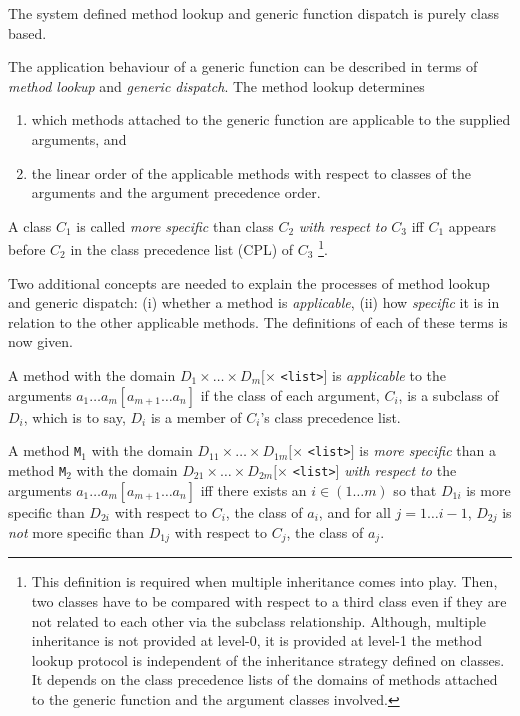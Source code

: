 \begin{optDefinition}
The system defined  method lookup and generic function dispatch is purely
class based.

The application behaviour of a generic function can be described in terms of
{\em method lookup\/} and {\em generic dispatch}. The method lookup determines
\begin{enumerate}
    \item which methods attached to the generic function are applicable to the
    supplied arguments, and

    \item the linear order of the applicable methods with respect to classes of
    the arguments and the argument precedence order.
\end{enumerate}

A class $C_1$ is called {\em more specific\/} than class $C_2$ {\em with respect
    to\/} $C_3$ iff $C_1$ appears before $C_2$ in the class precedence list
(CPL) of $C_3$
%
\footnote%
{%
    This definition is required when multiple
    inheritance comes into play. Then, two classes have to be compared with
    respect to a third class even if they are not related to each other via the
    subclass relationship.  Although, multiple inheritance is not provided at
    level-0, it is provided at level-1 the method lookup protocol is independent
    of the inheritance strategy defined on classes. It depends on the class
    precedence lists of the domains of methods attached to the generic function
    and the argument classes involved.%
}.

Two additional concepts are needed to explain the processes of method lookup and
generic dispatch: (i) whether a method is {\em applicable}, (ii) how {\em
    specific} it is in relation to the other applicable methods.  The
definitions of each of these terms is now given.

A method with the domain $D_1 \times \ldots \times D_m [\times$ \verb|<list>|$]$
is {\em applicable\/} to the arguments $a_1 \ldots a_m [a_{m+1} \ldots a_n]$ if
the class of each argument, $C_i$, is a subclass of $D_i$, which is to say,
$D_i$ is a member of $C_i$'s class precedence list.

A method {\tt M$_{1}$} with the domain $D_{11} \times \ldots \times D_{1m}
[\times$ \verb|<list>|$]$ is {\em more specific\/} than a method {\tt M$_{2}$}
with the domain $D_{21} \times \ldots \times D_{2m} [\times$ \verb|<list>|$]$
{\em with respect to} the arguments $a_1 \ldots a_m [a_{m+1} \ldots a_n]$ iff
there exists an $i\in (1 \ldots m)$ so that $D_{1i}$ is more specific than
$D_{2i}$ with respect to $C_i$, the class of $a_i$, and for all $j=1 \ldots
i-1$, $D_{2j}$ is {\em not} more specific than $D_{1j}$ with respect to $C_j$,
the class of $a_j$.


\end{optDefinition}
